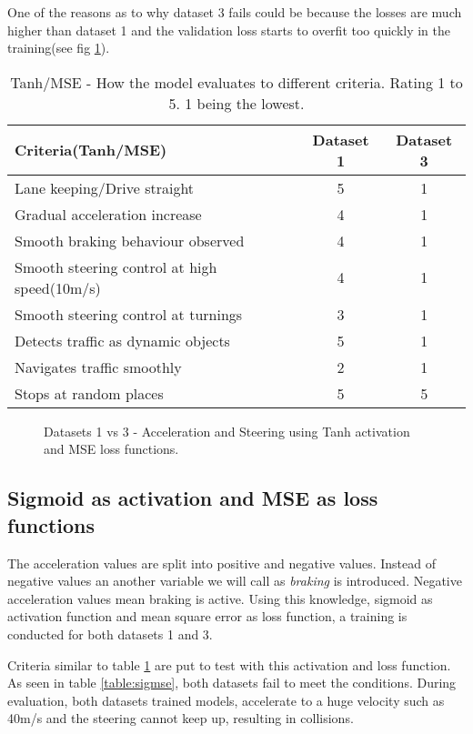 One of the reasons as to why dataset 3 fails could be because the losses are much higher
than dataset 1 and the validation loss starts to overfit too quickly in the training(see
fig \ref{fig:ds1andd3tanhactivatonMSE}).
\begin{table}[h]
    \centering
\begin{tabular}{lcc}
    \toprule
    Criteria(Tanh/MSE)& Dataset 1 & Dataset 3 \\\midrule
    Lane keeping/Drive straight  & 5 & 1  \\
    Gradual acceleration increase & 4 & 1\\
    Smooth braking behaviour observed & 4 & 1 \\
    Smooth steering control at high speed(10m/s) & 4 & 1 \\
    Smooth steering control at turnings & 3 & 1\\
    Detects traffic as dynamic objects & 5 & 1\\
    Navigates traffic smoothly & 2 & 1\\
    Stops at random places & 5 & 5 \\\bottomrule
\end{tabular}
\caption{Tanh/MSE - How the model evaluates to different criteria. Rating 1 to 5. 1 being the lowest.}
\label{table:tanhmse}
\end{table}
\begin{figure}[h]
	\centering
    \def\svgwidth{\textwidth}
    \caption{Datasets 1 vs 3 - Acceleration and Steering using Tanh activation and MSE loss
    functions.}
    \label{fig:ds1andd3tanhactivatonMSE}
\end{figure}

\subsection{Sigmoid as activation and MSE as loss functions}
The acceleration values are split into positive and negative values. Instead of negative
values an another variable we will call as \textit{braking} is introduced. Negative
acceleration values mean braking is active. Using this knowledge, sigmoid as activation function and mean
square error as loss function, a training is conducted for both datasets 1 and 3.

Criteria similar to table \ref{table:tanhmse} are put to test with this activation and
loss function. As seen in table \ref{table:sigmse}, both datasets fail to meet the
conditions. During evaluation, both datasets trained models, accelerate to a huge velocity
such as 40m/s and the steering cannot keep up, resulting in collisions.

